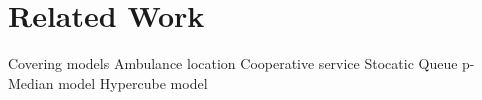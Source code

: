 \chapter{Related Work}
Covering models
Ambulance location
Cooperative service
Stocatic Queue p-Median model
Hypercube model
